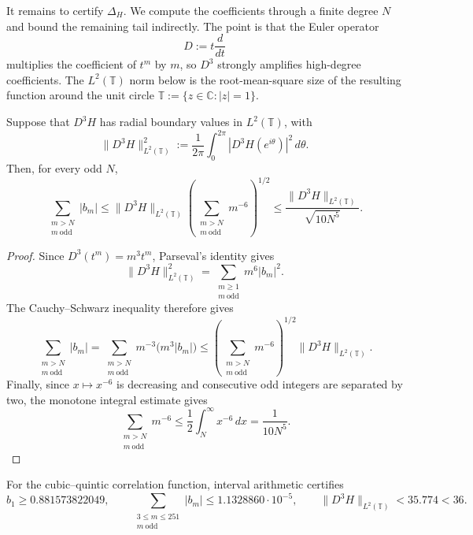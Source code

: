 It remains to certify $\Delta_H$.  We compute the coefficients through a
finite degree $N$ and bound the remaining tail indirectly.  The point is that
the Euler operator
\[
  D:=t\frac{d}{dt}
\]
multiplies the coefficient of $t^m$ by $m$, so $D^3$ strongly amplifies
high-degree coefficients.  The $L^2(\mathbb T)$ norm below is the
root-mean-square size of the resulting function around the unit circle
$\mathbb T:=\{z\in\mathbb C:|z|=1\}$.

\begin{lemma}
\label{lem:third-order-tail}
Suppose that $D^3H$ has radial boundary values in $L^2(\mathbb T)$, with
\[
  \|D^3H\|_{L^2(\mathbb T)}^2
  :=\frac{1}{2\pi}\int_0^{2\pi}
  |D^3H(e^{i\theta})|^2\,d\theta.
\]
Then, for every odd $N$,
\begin{equation}
  \sum_{\substack{m>N\\m\ \mathrm{odd}}}|b_m|
  \le
  \|D^3H\|_{L^2(\mathbb T)}
  \left(\sum_{\substack{m>N\\m\ \mathrm{odd}}}m^{-6}\right)^{1/2}
  \le
  \frac{\|D^3H\|_{L^2(\mathbb T)}}{\sqrt{10N^5}}.
  \label{eq:third-order-tail}
\end{equation}
\end{lemma}

\begin{proof}
Since $D^3(t^m)=m^3t^m$, Parseval's identity gives
\begin{equation}
  \|D^3H\|_{L^2(\mathbb T)}^2
  =\sum_{\substack{m\ge1\\m\ \mathrm{odd}}}m^6|b_m|^2.
  \label{eq:parseval-third-order}
\end{equation}
The Cauchy--Schwarz inequality therefore gives
\[
  \sum_{\substack{m>N\\m\ \mathrm{odd}}}|b_m|
  =\sum_{\substack{m>N\\m\ \mathrm{odd}}}
  m^{-3}\bigl(m^3|b_m|\bigr)
  \le
  \left(\sum_{\substack{m>N\\m\ \mathrm{odd}}}m^{-6}\right)^{1/2}
  \|D^3H\|_{L^2(\mathbb T)}.
\]
Finally, since $x\mapsto x^{-6}$ is decreasing and consecutive odd integers
are separated by two, the monotone integral estimate gives
\[
  \sum_{\substack{m>N\\m\ \mathrm{odd}}}m^{-6}
  \le\frac12\int_N^\infty x^{-6}\,dx
  =\frac{1}{10N^5}.
\]
\end{proof}

\begin{proposition}
\label{prop:certified-numerical-input}
For the cubic--quintic correlation function, interval arithmetic certifies
\begin{equation}
  b_1\ge0.881573822049,
  \qquad
  \sum_{\substack{3\le m\le251\\m\ \mathrm{odd}}}|b_m|
  \le1.1328860\cdot10^{-5},
  \qquad
  \|D^3H\|_{L^2(\mathbb T)}<35.774<36.
  \label{eq:certified-numerical-input}
\end{equation}
\end{proposition}

